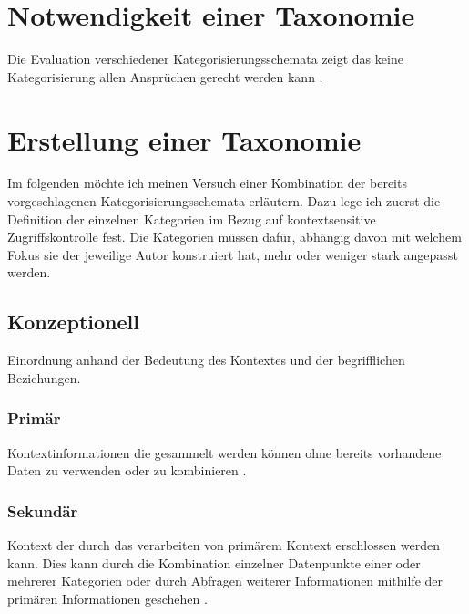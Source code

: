 \section{Notwendigkeit einer Taxonomie}
Die Evaluation verschiedener Kategorisierungsschemata zeigt das keine Kategorisierung allen Ansprüchen gerecht werden kann \cite{perera_context_2014}.
\section{ Erstellung einer Taxonomie }
Im folgenden möchte ich meinen Versuch einer Kombination der bereits vorgeschlagenen Kategorisierungsschemata erläutern. Dazu lege ich zuerst die Definition der einzelnen Kategorien im Bezug auf kontextsensitive Zugriffskontrolle fest. Die Kategorien müssen dafür, abhängig davon mit welchem Fokus sie der jeweilige Autor konstruiert hat, mehr oder weniger stark angepasst werden.
\subsection{Konzeptionell}
Einordnung anhand der Bedeutung des Kontextes und der begrifflichen Beziehungen.
\subsubsection{Primär}
Kontextinformationen die gesammelt werden können ohne bereits vorhandene Daten zu verwenden oder zu kombinieren \cite{abowd_towards_1999}. 
\subsubsection{Sekundär}
Kontext der durch das verarbeiten von primärem Kontext erschlossen werden kann. Dies kann durch die Kombination einzelner Datenpunkte einer oder mehrerer Kategorien oder durch Abfragen weiterer Informationen mithilfe der primären Informationen geschehen \cite{abowd_towards_1999}.
